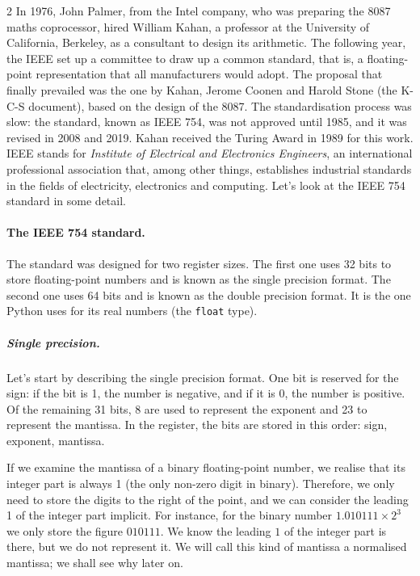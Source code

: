 \begin{paracol}{2}
In 1976, John Palmer, from the Intel company, who was preparing the 8087 maths coprocessor, hired William Kahan, a professor at the University of California, Berkeley, as a consultant to design its arithmetic. The following year, the IEEE set up a committee to draw up a common standard, that is, a floating-point representation that all manufacturers would adopt. The proposal that finally prevailed was the one by Kahan, Jerome Coonen and Harold Stone (the K-C-S document), based on the design of the 8087. The standardisation process was slow: the standard, known as IEEE 754, was not approved until 1985, and it was revised in 2008 and 2019. Kahan received the Turing Award in 1989 for this work. IEEE stands for \emph{Institute of Electrical and Electronics Engineers}, an international professional association that, among other things, establishes industrial standards in the fields of electricity, electronics and computing. Let's look at the IEEE 754 standard in some detail.

\paragraph{The IEEE 754 standard.} The standard was designed for two register sizes. The first one uses 32 bits to store floating-point numbers and is known as the single precision format. The second one uses 64 bits and is known as the double precision format. It is the one Python uses for its real numbers (the \texttt{float} type).

\subparagraph{Single precision.} Let's start by describing the single precision format. One bit is reserved for the sign: if the bit is 1, the number is negative, and if it is 0, the number is positive. Of the remaining 31 bits, 8 are used to represent the exponent and 23 to represent the mantissa. In the register, the bits are stored in this order: sign, exponent, mantissa.

 If we examine the mantissa of a binary floating-point number, we realise that its integer part is always 1 (the only non-zero digit in binary). Therefore, we only need to store the digits to the right of the point, and we can consider the leading 1 of the integer part implicit. For instance, for the binary number $1.010111\times 2^{3}$ we only store the figure $010111$. We know the leading $1$ of the integer part is there, but we do not represent it. We will call this kind of mantissa a normalised mantissa; we shall see why later on.


\end{paracol}
